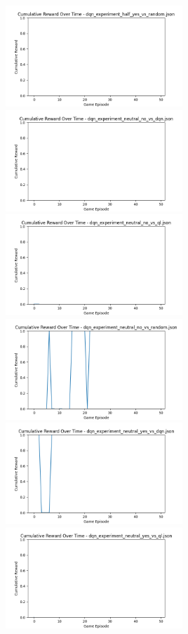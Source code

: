 \includegraphics[width=0.5\textwidth]{images/cumulative_reward_dqn_experiment_half_yes_vs_random.png} 
\includegraphics[width=0.5\textwidth]{images/cumulative_reward_dqn_experiment_neutral_no_vs_dqn.png} 
\includegraphics[width=0.5\textwidth]{images/cumulative_reward_dqn_experiment_neutral_no_vs_ql.png} 
\includegraphics[width=0.5\textwidth]{images/cumulative_reward_dqn_experiment_neutral_no_vs_random.png} 
\includegraphics[width=0.5\textwidth]{images/cumulative_reward_dqn_experiment_neutral_yes_vs_dqn.png} 
\includegraphics[width=0.5\textwidth]{images/cumulative_reward_dqn_experiment_neutral_yes_vs_ql.png} 
